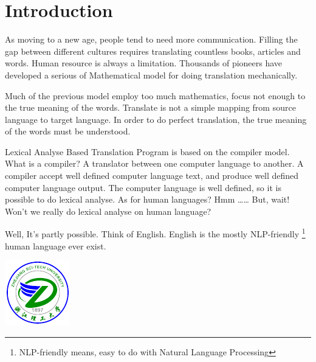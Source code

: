 \documentclass[a4paper]{article}
\title{\LABTP}
\author{microcai}
\newcommand{\LABTP}{{Lexical Analyse Based Translation Program }}
\begin{document}
\maketitle

\begin{abstract}
\LABTP extends popular compiler model to support translating human languages.

\end{abstract}

\section{Introduction}

As moving to a new age, people tend to need more communication. Filling the gap
between different cultures requires translating countless books, articles and
words. Human resource is always a limitation. Thousands of pioneers have developed
a serious of Mathematical model for doing translation mechanically. 

Much of the previous model employ too much mathematics, focus not enough to the true meaning
of the words. Translate is not a simple mapping from source language to target language.
In order to do perfect translation, the true meaning of the words must be understood. 

\LABTP is based on the compiler model. What is a compiler? A translator between
one computer language to another. A compiler accept well defined computer language
text, and produce well defined computer language output. The computer language is well
defined, so it is possible to do lexical analyse. As for human languages? Hmm \ldots\ldots 
But, wait! Won't we really do lexical analyse on human language?

Well, It's partly possible. Think of English. English is the mostly
NLP-friendly \footnote{NLP-friendly means, easy to do with Natural Language Processing}
human language ever exist.

\includegraphics{zstu}
\end{document}
